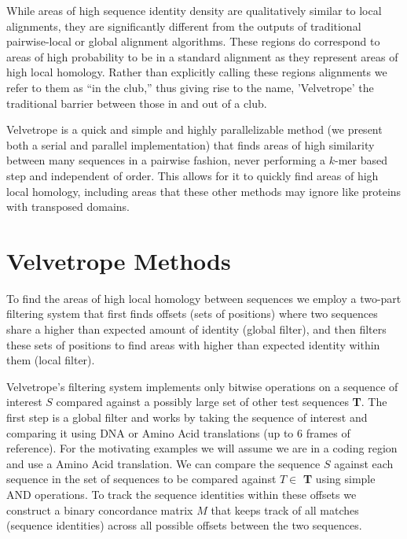 \documentclass[phd,tocprelim]{cornell}
\begin{document}
While areas of high sequence identity density are qualitatively similar to local alignments, they are significantly different from the outputs of traditional pairwise-local or global alignment algorithms. These regions do correspond to areas of high probability to be in a standard alignment as they represent areas of high local homology. Rather than explicitly calling these regions alignments we refer to them as ``in the club,'' thus giving rise to the name, 'Velvetrope' the traditional barrier between those in and out of a club.

Velvetrope is a quick and simple and highly parallelizable method (we present both a serial and parallel implementation)
that finds areas of high similarity between many
sequences in a pairwise fashion, never performing a $k$-mer based step and independent of order. This allows for it
to quickly find areas of high local homology, including areas that these other
methods may ignore like proteins with transposed domains.


\chapter{Velvetrope Methods} %
\label{cha:Velvetrope Methods}

To find the areas of high local homology between sequences we employ a two-part filtering system that first finds offsets (sets of positions) where two sequences share a higher than expected amount of identity (global filter), and then filters these sets of positions to find areas with higher than expected identity within them (local filter).

Velvetrope's filtering system implements only bitwise operations on a sequence of interest $S$ compared against a possibly large set of other test sequences \textbf{T}. The first step is a global filter and works by taking the sequence of interest and comparing it using DNA or Amino Acid translations (up to 6 frames of reference). For the motivating examples we will assume we are in a coding region and use a Amino Acid translation. We can compare the sequence $S$ against each sequence in the set of sequences to be compared against $T \in$ \textbf{T}  using simple AND operations. To track the sequence identities within these offsets we construct a binary concordance matrix $M$ that keeps track of all matches (sequence identities) across all possible offsets between the two sequences.
\end{document}

